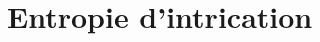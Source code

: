 \documentclass[10pt,a4paper]{beamer}
\newcommand{\ket}[1]{\ensuremath{|#1\rangle}\xspace}
\newcommand{\1}{\ensuremath{\ket{\om_1\bom_1}}\xspace}
\newcommand{\2}{\ensuremath{\ket{\om_2\bom_2}}\xspace}
\newcommand{\spinu}{\ensuremath{\ket{\uparrow}}\xspace}
\newcommand{\spind}{\ensuremath{\ket{\downarrow}}\xspace}
\begin{document}
\section{Entropie d'intrication}
\end{document}
